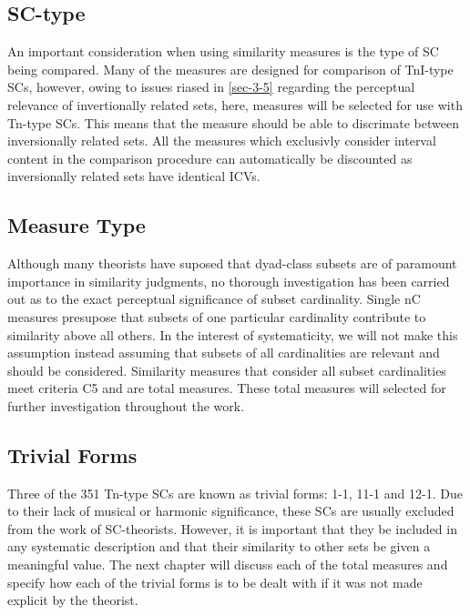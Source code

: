 \documentclass{article}
\begin{document}
\subsection{SC-type}
\label{sec-6-3}

An important consideration when using similarity measures is the type
of SC being compared. Many of the measures are designed for comparison
of TnI-type SCs, however, owing to issues riased in \ref{sec-3-5} regarding the perceptual relevance of invertionally related
sets, here, measures will be selected for use with Tn-type SCs. This
means that the measure should be able to discrimate between
inversionally related sets. All the measures which exclusivly consider
interval content in the comparison procedure can automatically be
discounted as inversionally related sets have identical ICVs.
\subsection{Measure Type}
\label{sec-6-4}

Although many theorists have suposed that dyad-class subsets are of
paramount importance in similarity judgments, no thorough
investigation has been carried out as to the exact perceptual
significance of subset cardinality. Single nC measures presupose that
subsets of one particular cardinality contribute to similarity above
all others. In the interest of systematicity, we will not make this
assumption instead assuming that subsets of all cardinalities are
relevant and should be considered. Similarity measures that consider
all subset cardinalities meet criteria C5 and are total
measures. These total measures will selected for further investigation
throughout the work.
\subsection{Trivial Forms}
\label{sec-6-5}

Three of the 351 Tn-type SCs are known as trivial forms: 1-1, 11-1 and
12-1. Due to their lack of musical or harmonic significance, these SCs
are usually excluded from the work of SC-theorists. However, it is
important that they be included in any systematic description and that
their similarity to other sets be given a meaningful value. The next
chapter will discuss each of the total measures and specify how each
of the trivial forms is to be dealt with if it was not made explicit
by the theorist. 
\end{document}
